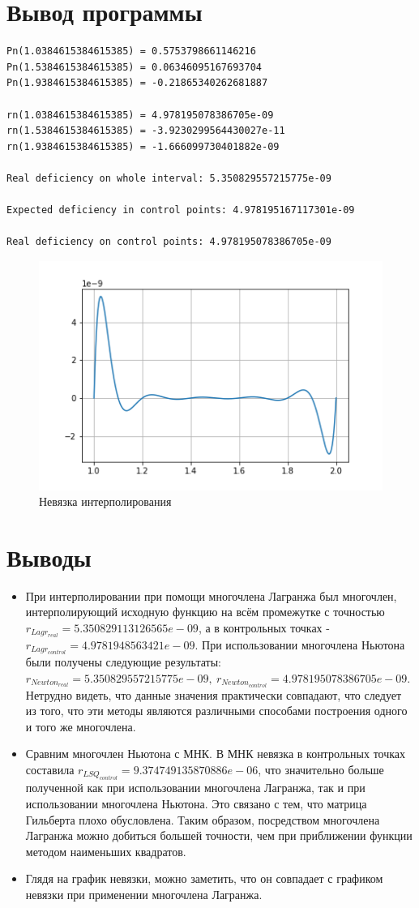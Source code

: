 \documentclass[14pt, a4paper]{article}
\begin{document}
  \section{Вывод программы}
\begin{verbatim}
Pn(1.0384615384615385) = 0.5753798661146216
Pn(1.5384615384615385) = 0.06346095167693704
Pn(1.9384615384615385) = -0.21865340262681887

rn(1.0384615384615385) = 4.978195078386705e-09
rn(1.5384615384615385) = -3.9230299564430027e-11
rn(1.9384615384615385) = -1.666099730401882e-09

Real deficiency on whole interval: 5.350829557215775e-09

Expected deficiency in control points: 4.978195167117301e-09

Real deficiency on control points: 4.978195078386705e-09

\end{verbatim}
\begin{figure}[h!]
  \center
  \includegraphics[width=0.6\linewidth]{NewtonDiff.png}
  \caption{Невязка интерполирования}
\end{figure}

  \section{Выводы}
  \begin{itemize}
  \item
  При интерполировании при помощи многочлена Лагранжа был многочлен, интерполирующий исходную функцию на всём промежутке с точностью $r_{Lagr_{real}} = 5.350829113126565e-09$, а в контрольных точках - $r_{Lagr_{control}} = 4.9781948563421e-09$. При использовании многочлена Ньютона были получены следующие результаты: $r_{Newton_{real}} = 5.350829557215775e-09, \ r_{Newton_{control}} = 4.978195078386705e-09$. Нетрудно видеть, что данные значения практически совпадают, что следует из того, что эти методы являются различными способами построения одного и того же многочлена.
  \item
  Сравним многочлен Ньютона с МНК. В МНК невязка в контрольных точках составила $r_{LSQ_{control}} = 9.374749135870886e-06$, что значительно больше полученной как при использовании многочлена Лагранжа, так и при использовании многочлена Ньютона. Это связано с тем, что матрица Гильберта плохо обусловлена. Таким образом, посредством многочлена Лагранжа можно добиться большей точности, чем при приближении функции методом наименьших квадратов.
  \item
  Глядя на график невязки, можно заметить, что он совпадает с графиком невязки при применении многочлена Лагранжа.
  \end{itemize}
\end{document}
